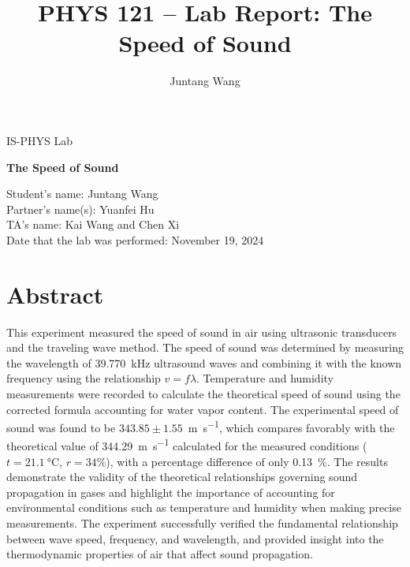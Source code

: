 \documentclass[12pt]{article}
\title{PHYS 121 -- Lab Report: The Speed of Sound}
\author{Juntang Wang}
\date{}
\begin{document}
\begin{titlepage}
\centering
\vspace*{2cm}

{\Large IS-PHYS Lab}

\vspace{3cm}

{\Huge\bfseries The Speed of Sound}

\vspace{4cm}

\begin{flushright}
Student's name: Juntang Wang\\[0.5cm]
Partner's name(s): Yuanfei Hu\\[0.5cm]
TA's name: Kai Wang and Chen Xi\\[2cm]
Date that the lab was performed: November 19, 2024
\end{flushright}

\vfill

\end{titlepage}

\newpage

\section{Abstract}

This experiment measured the speed of sound in air using ultrasonic transducers and the traveling wave method. The speed of sound was determined by measuring the wavelength of \SI{39.770}{\kilo\hertz} ultrasound waves and combining it with the known frequency using the relationship $v = f\lambda$. Temperature and humidity measurements were recorded to calculate the theoretical speed of sound using the corrected formula accounting for water vapor content. The experimental speed of sound was found to be $343.85 \pm 1.55$~\si{\meter\per\second}, which compares favorably with the theoretical value of \SI{344.29}{\meter\per\second} calculated for the measured conditions ($t = \SI{21.1}{\celsius}$, $r = 34\%$), with a percentage difference of only \SI{0.13}{\percent}. The results demonstrate the validity of the theoretical relationships governing sound propagation in gases and highlight the importance of accounting for environmental conditions such as temperature and humidity when making precise measurements. The experiment successfully verified the fundamental relationship between wave speed, frequency, and wavelength, and provided insight into the thermodynamic properties of air that affect sound propagation.
\end{document}
